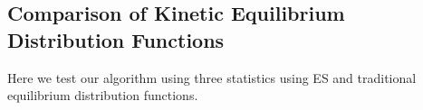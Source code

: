 \documentclass{rsproca}%
\begin{document}
\subsection{Comparison of Kinetic Equilibrium Distribution Functions}
Here we test our algorithm using three statistics using ES and traditional equilibrium distribution functions.

\end{document}

